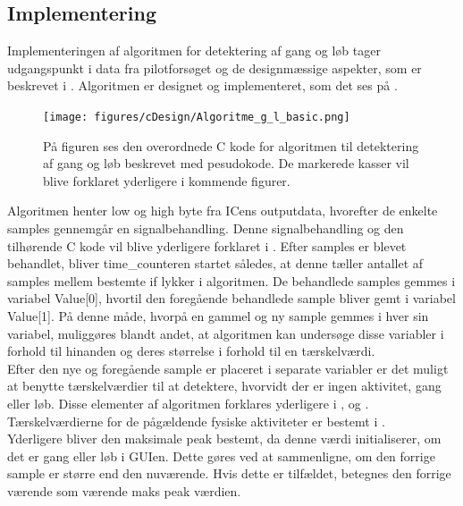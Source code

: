 \subsection{Implementering}
Implementeringen af algoritmen for detektering af gang og løb tager udgangspunkt i data fra pilotforsøget og de designmæssige aspekter, som er beskrevet i . Algoritmen er designet og implementeret, som det ses på .
\begin{figure}[H]
	\centering
	\texttt{[image: figures/cDesign/Algoritme\_g\_l\_basic.png]}
	\caption{På figuren ses den overordnede C kode for algoritmen til detektering af gang og løb beskrevet med pesudokode. De markerede kasser vil blive forklaret yderligere i kommende figurer.}
	\label{fig:basic_algo_g_l}
\end{figure} \vspace{-0.5cm}
Algoritmen henter low og high byte fra ICens outputdata, hvorefter de enkelte samples gennemgår en signalbehandling. Denne signalbehandling og den tilhørende C kode vil blive yderligere forklaret i . Efter samples er blevet behandlet, bliver time\_counteren startet således, at denne tæller antallet af samples mellem bestemte if lykker i algoritmen. De behandlede samples gemmes i variabel Value[0], hvortil den foregående behandlede sample bliver gemt i variabel Value[1]. På denne måde, hvorpå en gammel og ny sample gemmes i hver sin variabel, muliggøres blandt andet, at algoritmen kan undersøge disse variabler i forhold til hinanden og deres størrelse i forhold til en tærskelværdi. \\
Efter den nye og foregående sample er placeret i separate variabler er det muligt at benytte tærskelværdier til at detektere, hvorvidt der er ingen aktivitet, gang eller løb. Disse elementer af algoritmen forklares yderligere i ,  og . Tærskelværdierne for de pågældende fysiske aktiviteter er bestemt i . \\ 
Yderligere bliver den maksimale peak bestemt, da denne værdi initialiserer, om det er gang eller løb i GUIen. Dette gøres ved at sammenligne, om den forrige sample er større end den nuværende. Hvis dette er tilfældet, betegnes den forrige værende som værende maks peak værdien. %


